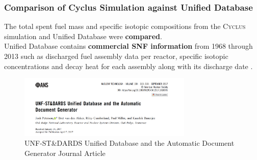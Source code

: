 \begin{frame}
    \frametitle{Comparison of Cyclus Simulation against Unified Database}
    The total spent fuel mass and specific isotopic compositions from the \textsc{Cyclus} 
        simulation and Unified Database were \textbf{compared}. 
        \\ 
        
    Unified Database contains \textbf{commercial SNF information} from 1968 through 2013 such as 
        discharged fuel assembly data per reactor, specific isotopic concentrations and 
        decay heat for each assembly along with its discharge date \cite{peterson_unf_2017}. 
        \\ 
        
        \begin{figure}[htbp!]
            \begin{center}
                \includegraphics[height=3cm]{../figures/peterson-unf}
            \end{center}
                    \caption{UNF-ST\&DARDS Unified Database and the Automatic
                    Document Generator Journal Article}
            \label{fig:peterson-unf}
            \end{figure}
\end{frame}
  